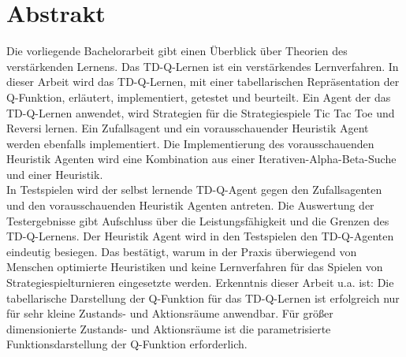 \chapter*{Abstrakt}

Die vorliegende Bachelorarbeit gibt einen Überblick über Theorien des verstärkenden Lernens. Das TD-Q-Lernen ist ein verstärkendes Lernverfahren. 
In dieser Arbeit wird das TD-Q-Lernen, mit einer tabellarischen Repräsentation der Q-Funktion, erläutert, implementiert, getestet und beurteilt. 
Ein Agent der das TD-Q-Lernen anwendet, wird Strategien für die Strategiespiele Tic Tac Toe und Reversi lernen. 
Ein Zufallsagent und ein vorausschauender Heuristik Agent werden ebenfalls implementiert. Die Implementierung des vorausschauenden Heuristik Agenten wird eine Kombination aus einer Iterativen-Alpha-Beta-Suche und einer Heuristik. \\

In Testspielen wird der selbst lernende TD-Q-Agent gegen den Zufallsagenten und den vorausschauenden Heuristik Agenten antreten. Die Auswertung der Testergebnisse gibt Aufschluss über die Leistungsfähigkeit und die Grenzen des TD-Q-Lernens. 
Der Heuristik Agent wird in den Testspielen den TD-Q-Agenten eindeutig besiegen. Das bestätigt, warum in der Praxis überwiegend von Menschen optimierte Heuristiken und keine Lernverfahren für das Spielen von Strategiespielturnieren eingesetzte werden. 
Erkenntnis dieser Arbeit u.a. ist: Die tabellarische Darstellung der Q-Funktion für das TD-Q-Lernen ist erfolgreich nur für sehr kleine Zustands- und Aktionsräume anwendbar. Für größer dimensionierte Zustands- und Aktionsräume ist die parametrisierte Funktionsdarstellung der Q-Funktion erforderlich. 




